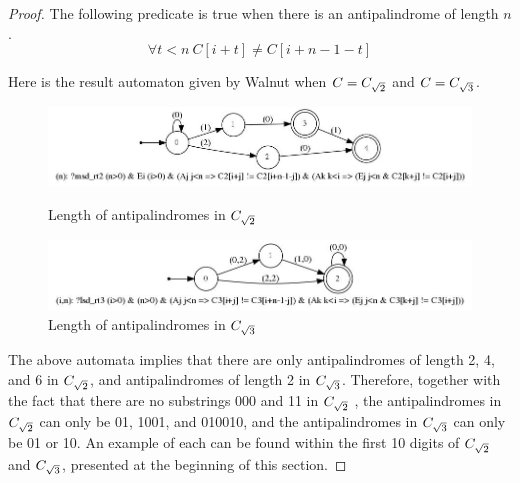 \begin{proof}
The following predicate is true when there is an antipalindrome of length  $n$.
\[\forall t<n~ C[i+t] \ne C[i+n-1-t]\]

Here is the result automaton given by Walnut when $C=C_{\sqrt{2}}$ and $C = C_{\sqrt{3}}$.

\begin{figure}[h!]
\vspace{10mm}
	\begin{minipage}{0.45\textwidth}
      \centering
      \includegraphics[width=\linewidth]{sturmian_word_paper/paper_images/theorem16_nC2.jpg}
      \caption{Length of antipalindromes in $C_{\sqrt{2}}$}
      \centering

  	\end{minipage}%
    \hspace{0.05\textwidth}
    \begin{minipage}{0.45\textwidth}
      \centering
      \includegraphics[width=\linewidth]{sturmian_word_paper/paper_images/theorem16.jpg}
      \caption{Length of antipalindromes in $C_{\sqrt{3}}$}
      \centering

    \end{minipage}
\end{figure}

The above automata implies that there are only antipalindromes of length 2, 4, and 6 in $C_{\sqrt{2}}$, and antipalindromes of length 2 in $C_{\sqrt{3}}$. Therefore, together with the fact that there are no substrings 000 and 11 in $C_{\sqrt{2}}$ , the antipalindromes in $C_{\sqrt{2}}$ can only be 01, 1001, and 010010, and the antipalindromes in $C_{\sqrt{3}}$ can only be 01 or 10. An example of each can be found within the first 10 digits of $C_{\sqrt{2}}$ and $C_{\sqrt{3}}$, presented at the beginning of this section.
\end{proof}

